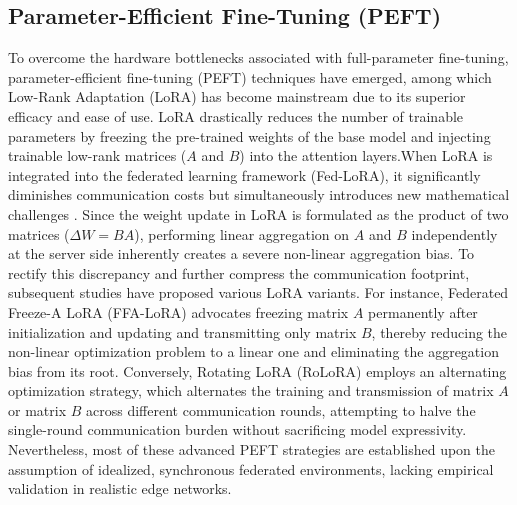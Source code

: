\documentclass[journal]{IEEEtran}
\begin{document}
\subsection{Parameter-Efficient Fine-Tuning (PEFT)}To overcome the hardware bottlenecks associated with full-parameter fine-tuning, parameter-efficient fine-tuning (PEFT) techniques have emerged, among which Low-Rank Adaptation (LoRA) \cite{hu2021lora} has become mainstream due to its superior efficacy and ease of use. LoRA drastically reduces the number of trainable parameters by freezing the pre-trained weights of the base model and injecting trainable low-rank matrices ($A$ and $B$) into the attention layers.When LoRA is integrated into the federated learning framework (Fed-LoRA), it significantly diminishes communication costs but simultaneously introduces new mathematical challenges \cite{zhang2023fedpet}. Since the weight update in LoRA is formulated as the product of two matrices ($\Delta W = BA$), performing linear aggregation on $A$ and $B$ independently at the server side inherently creates a severe non-linear aggregation bias. To rectify this discrepancy and further compress the communication footprint, subsequent studies have proposed various LoRA variants. For instance, Federated Freeze-A LoRA (FFA-LoRA) \cite{ffa_lora_paper} advocates freezing matrix $A$ permanently after initialization and updating and transmitting only matrix $B$, thereby reducing the non-linear optimization problem to a linear one and eliminating the aggregation bias from its root. Conversely, Rotating LoRA (RoLoRA) \cite{rolora_paper} employs an alternating optimization strategy, which alternates the training and transmission of matrix $A$ or matrix $B$ across different communication rounds, attempting to halve the single-round communication burden without sacrificing model expressivity. Nevertheless, most of these advanced PEFT strategies are established upon the assumption of idealized, synchronous federated environments, lacking empirical validation in realistic edge networks.
\end{document}
